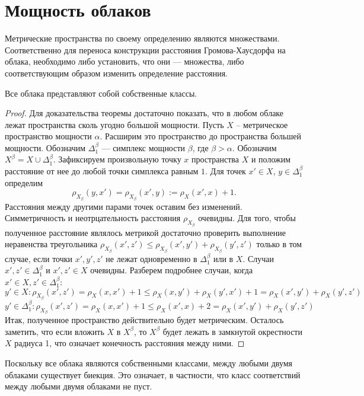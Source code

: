 \section{Мощность облаков}
Метрические пространства по своему определению являются множествами.
Соответственно для переноса конструкции расстояния Громова-Хаусдорфа на облака,
необходимо либо установить, что они --- множества, либо \\ соответствующим
образом изменить определение расстояния.
    \begin{theorem} Все облака представляют собой собственные классы.
	\end{theorem}
	\begin{proof} Для доказательства теоремы достаточно показать, что в любом
облаке лежат пространства сколь угодно большой мощности.  Пусть $X$ --
метрическое пространство мощности $\alpha$. Расширим это пространство до
пространства большей мощности. Обозначим $\Delta^\beta_1$ --- симплекс мощности
$\beta$, где $\beta > \alpha$. Обозначим $X^\beta = X \cup \Delta^\beta_1$.
Зафиксируем произвольную точку $x$ пространства $X$ и положим расстояние от нее
до любой точки симплекса равным $1$. Для точек $x' \in X$,
$y \in \Delta^\beta_1$ определим
$$\rho_{X_\beta}(y,x') = \rho_{X_\beta}(x',y) := \rho_X(x',x) + 1.$$
Расстояния между другими парами точек оставим без изменений.
Симметричность и неотрцательность расстояния $\rho_{X_{\beta}}$ очевидны.
Для того, чтобы
полученное расстояние являлось метрикой достаточно проверить выполнение
неравенства треугольника
$\rho_{X_\beta}(x',z') \le \rho_{X_\beta}(x',y') +\rho_{X_\beta}(y',z')$
только в том случае, если точки $x', y', z'$ не лежат одновременно в
$\Delta^\beta_1$ или в $X$. Случаи $x', z' \in \Delta^\beta_1$ и $ x', z' \in X$
очевидны. Разберем подробнее случаи, когда $x' \in X, z' \in \Delta^\beta_1$:
		$$ y' \in X: \rho_{X_\beta}(x', z') = \rho_X(x,x') + 1 \le \rho_X(x,y') + \rho_X(y',x') + 1 = \rho_X(x',y') + \rho_X(y',z')$$
		$$y' \in \Delta^\beta_1: \rho_{X_\beta}(x', z') = \rho_X(x,x') + 1 \le \rho_X(x',x) + 2 = \rho_X(x',y') + \rho_X(y',z')$$
		Итак, полученное пространство действительно будет метрическим. Осталось
заметить, что если вложить $X$ в $X^\beta$, то $X^\beta$ будет лежать в
замкнутой окрестности $X$ радиуса 1, что означает конечность расстояния между
ними.
 	 \end{proof}

 	 \begin{remark} Поскольку все облака являются собственными классами, между
любыми двумя облаками существует биекция. Это означает, в частности, что класс соответствий между любыми двумя облаками не пуст.
 	 \end{remark}

